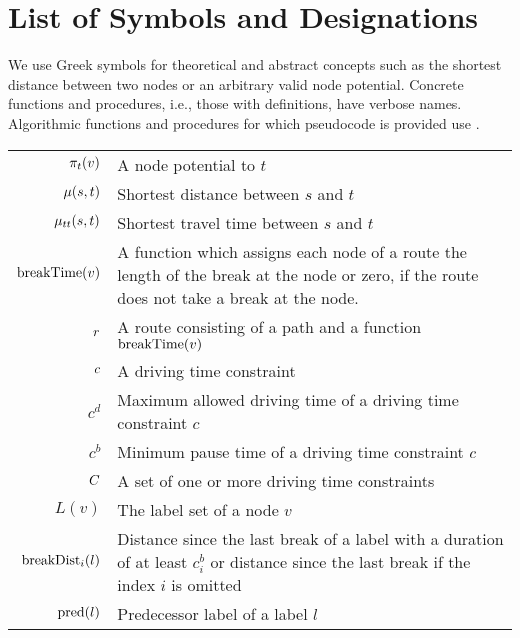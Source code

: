 \section{List of Symbols and Designations}
\label{app:symbols}

We use Greek symbols for theoretical and abstract concepts such as the shortest distance between two nodes or an arbitrary valid node potential. Concrete functions and procedures, i.e., those with definitions, have verbose names. Algorithmic functions and procedures for which pseudocode is provided use .

\begin{tabular}{rp{}}
	$\pi_t(v)$         & A node potential to $t$                                                                                                                    \\
	$\mu(s,t)$          & Shortest distance between $s$ and $t$                                                                                                      \\
	$\mu_{tt}(s,t)$        & Shortest travel time between $s$ and $t$                                                                                                   \\
	$\operatorname{breakTime}(v)$           & A function which assigns each node of a route the length of the break at the node or zero, if the route does not take a break at the node.
	\\
	$r$                  & A route consisting of a path and a function $\operatorname{breakTime}(v)$                                                                                \\
	$c$                  & A driving time constraint                                                                                                                  \\
	$c^d$                     & Maximum allowed driving time of a driving time constraint $c$                                                                              \\
	$c^b$                     & Minimum pause time of a driving time constraint $c$                                                                                   \\
	$C$               & A set of one or more driving time constraints                                                                                              \\
	$L(v)$                    & The label set of a node $v$                                                                                                                \\
	$\operatorname{breakDist}_i(l)$         & Distance since the last break of a label with a duration of at least $c_i^b$ or distance since the last break if the index $i$ is omitted  \\
	$\operatorname{pred}(l)$                & Predecessor label of a label $l$                                                                                                           \\


\end{tabular}
